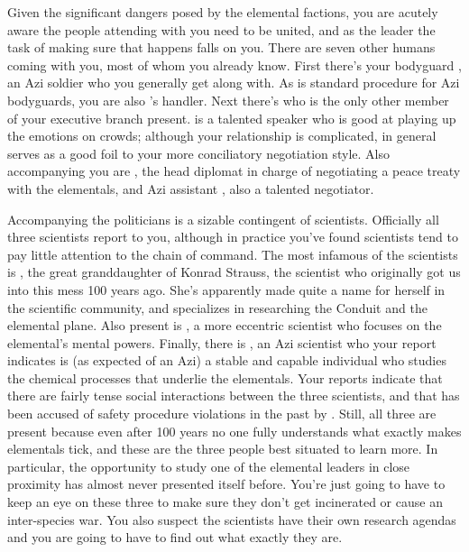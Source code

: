 \documentclass[char]{elementals}
\begin{document}
Given the significant dangers posed by the elemental factions, you are acutely aware the people attending with you need to be united, and as the leader the task of making sure that happens falls on you. There are seven other humans coming with you, most of whom you already know. First there's your bodyguard \cRomeo{\intro}, an Azi soldier who you generally get along with. As is standard procedure for Azi bodyguards, you are also \cRomeo{}'s handler. Next there's \cDema{\intro} who is the only other member of your executive branch present. \cDema{\They} is a talented speaker who is good at playing up the emotions on crowds; although your relationship is complicated, in general \cDema{\they} serves as a good foil to your more conciliatory negotiation style. Also accompanying you are \cAvatar{\intro}, the head diplomat in charge of negotiating a peace treaty with the elementals, and \cAvatar{\their} Azi assistant \cDiplomat{\intro}, also a talented negotiator.

Accompanying the politicians is a sizable contingent of scientists. Officially all three scientists report to you, although in practice you've found scientists tend to pay little attention to the chain of command. The most infamous of the scientists is \cGD{\intro}, the great granddaughter of Konrad Strauss, the scientist who originally got us into this mess 100 years ago. She's apparently made quite a name for herself in the scientific community, and specializes in researching the Conduit and the elemental plane. Also present is \cMS{\intro}, a more eccentric scientist who focuses on the elemental's mental powers. Finally, there is \cScientist{\intro}, an Azi scientist who your report indicates is (as expected of an Azi) a stable and capable individual who studies the chemical processes that underlie the elementals. Your reports indicate that there are fairly tense social interactions between the three scientists, and that \cMS{} has been accused of safety procedure violations in the past by \cScientist{}. Still, all three are present because even after 100 years no one fully understands what exactly makes elementals tick, and these are the three people best situated to learn more. In particular, the opportunity to study one of the elemental leaders in close proximity has almost never presented itself before. You're just going to have to keep an eye on these three to make sure they don't get incinerated or cause an inter-species war. You also suspect the scientists have their own research agendas and you are going to have to find out what exactly they are.
\end{document}
